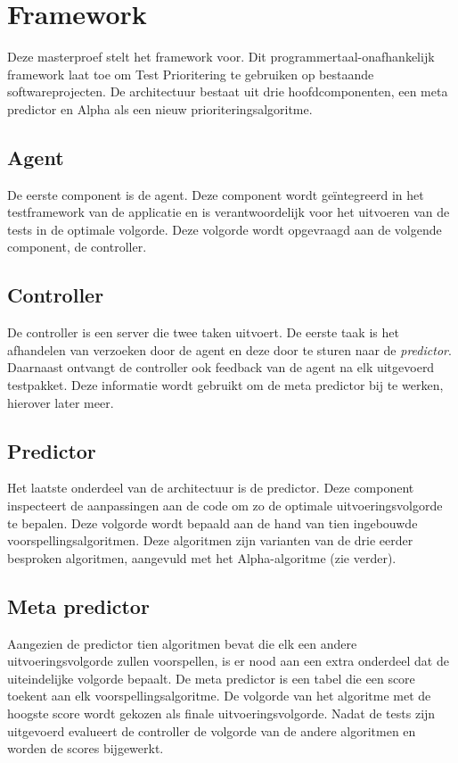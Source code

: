 \section{Framework}
\noindent Deze masterproef stelt het \velocity{} framework voor. Dit programmertaal-onafhankelijk framework laat toe om Test Prioritering te gebruiken op bestaande softwareprojecten. De architectuur bestaat uit drie hoofdcomponenten, een meta predictor en Alpha als een nieuw prioriteringsalgoritme.

\subsection{Agent}
\noindent De eerste component is de agent. Deze component wordt ge\"integreerd in het testframework van de applicatie en is verantwoordelijk voor het uitvoeren van de tests in de optimale volgorde. Deze volgorde wordt opgevraagd aan de volgende component, de controller.

\subsection{Controller}
\noindent De controller is een server die twee taken uitvoert. De eerste taak is het afhandelen van verzoeken door de agent en deze door te sturen naar de \emph{predictor}. Daarnaast ontvangt de controller ook feedback van de agent na elk uitgevoerd testpakket. Deze informatie wordt gebruikt om de meta predictor bij te werken, hierover later meer.

\subsection{Predictor}
\noindent Het laatste onderdeel van de architectuur is de predictor. Deze component inspecteert de aanpassingen aan de code om zo de optimale uitvoeringsvolgorde te bepalen. Deze volgorde wordt bepaald aan de hand van tien ingebouwde voorspellingsalgoritmen. Deze algoritmen zijn varianten van de drie eerder besproken algoritmen, aangevuld met het Alpha-algoritme (zie verder).

\subsection{Meta predictor}
\noindent Aangezien de predictor tien algoritmen bevat die elk een andere uitvoeringsvolgorde zullen voorspellen, is er nood aan een extra onderdeel dat de uiteindelijke volgorde bepaalt. De meta predictor is een tabel die een score toekent aan elk voorspellingsalgoritme. De volgorde van het algoritme met de hoogste score wordt gekozen als finale uitvoeringsvolgorde. Nadat de tests zijn uitgevoerd evalueert de controller de volgorde van de andere algoritmen en worden de scores bijgewerkt.

